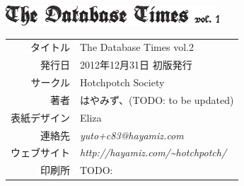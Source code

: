 \documentclass[b5paper,papersize,tombow,11pt]{jsbook}
\begin{document}
\vspace*{60mm}

\begin{center}
 \includegraphics[width=8cm]{images/colophon.eps}
 \par\vspace*{1mm}
 \begin{tabular}{rl}
  \hline
  タイトル & The Database Times vol.2 \\
  発行日 & 2012年12月31日 初版発行 \\
  サークル & Hotchpotch Society \\
  著者 & はやみず、(TODO: to be updated) \\
  表紙デザイン & Eliza \\
  連絡先 & {\it yuto+c83@hayamiz.com} \\
  ウェブサイト & {\it http://hayamiz.com/\~{}hotchpotch/} \\
  印刷所 & TODO: \\
  \hline
 \end{tabular}
\end{center}
\end{document}
